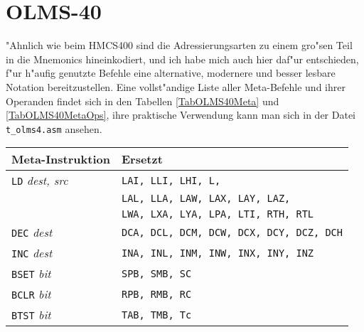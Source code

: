 \documentclass[12pt,a4paper,twoside]{report}
\newcommand{\tty}[1]{{\tt #1}}
\begin{document}
\section{OLMS-40}

"Ahnlich wie beim HMCS400 sind die Adressierungsarten zu einem
gro"sen Teil in die Mnemonics hineinkodiert, und ich habe mich
auch hier daf"ur entschieden, f"ur h"aufig genutzte Befehle eine
alternative, modernere und besser lesbare Notation
bereitzustellen.
Eine vollst"andige Liste aller Meta-Befehle und ihrer Operanden
findet sich in den Tabellen \ref{TabOLMS40Meta} und
\ref{TabOLMS40MetaOps}, ihre praktische Verwendung kann man sich
in der Datei \tty{t\_olms4.asm} ansehen.

\begin{table*}
\begin{center}\begin{tabular}{|l|l|}
\hline
Meta-Instruktion          & Ersetzt \\
\hline
\tty{LD} {\em dest, src}        & \tty{LAI, LLI, LHI, L,} \\
                                & \tty{LAL, LLA, LAW, LAX, LAY, LAZ,} \\
                                & \tty{LWA, LXA, LYA, LPA, LTI, RTH, RTL} \\
\tty{DEC} {\em dest}            & \tty{DCA, DCL, DCM, DCW, DCX, DCY, DCZ, DCH} \\
\tty{INC} {\em dest}            & \tty{INA, INL, INM, INW, INX, INY, INZ} \\
\tty{BSET} {\em bit}            & \tty{SPB, SMB, SC} \\
\tty{BCLR} {\em bit}            & \tty{RPB, RMB, RC} \\
\tty{BTST} {\em bit}            & \tty{TAB, TMB, Tc} \\
\hline
\end{tabular}\end{center}
\caption{Meta-Befehle OLMS-40}
\label{TabOLMS40Meta}
\end{table*}
\end{document}
